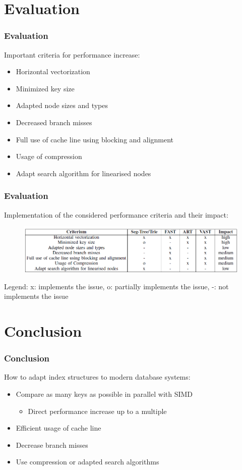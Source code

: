 \documentclass{beamer}
\begin{document}
\section{Evaluation}

\begin{frame}
\frametitle{Evaluation}
Important criteria for performance increase:
\begin{itemize}
	\item Horizontal vectorization
	\item Minimized key size
	\item Adapted node sizes and types
	\item Decreased branch misses
	\item Full use of cache line using blocking and alignment
	\item Usage of compression
	\item Adapt search algorithm for linearised nodes
\end{itemize}
\end{frame}

\begin{frame}
\frametitle{Evaluation}
Implementation of the considered performance criteria and their impact:
\begin{figure}
	\includegraphics[width=1.05\textwidth]{img/table_eval.png}
\end{figure}
Legend: x: implements the issue, o: partially implements the issue, -: not implements the issue
\end{frame}

\section{Conclusion}
\begin{frame}
\frametitle{Conclusion}
How to adapt index structures to modern database systems:
\begin{itemize}
	\item Compare as many keys as possible in parallel with SIMD
	\begin{itemize}
		\item Direct performance increase up to a multiple
	\end{itemize}
	\item Efficient usage of cache line
	\item Decrease branch misses
	\item Use compression or adapted search algorithms
	\end{itemize}
\end{frame}
\end{document}
